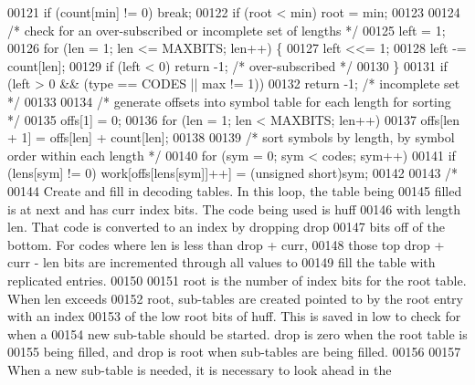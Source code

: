 \begin{DoxyCode}
00121         \textcolor{keywordflow}{if} (count[min] != 0) \textcolor{keywordflow}{break};
00122     \textcolor{keywordflow}{if} (root < min) root = min;
00123 
00124     \textcolor{comment}{/* check for an over-subscribed or incomplete set of lengths */}
00125     left = 1;
00126     \textcolor{keywordflow}{for} (len = 1; len <= MAXBITS; len++) \{
00127         left <<= 1;
00128         left -= count[len];
00129         \textcolor{keywordflow}{if} (left < 0) \textcolor{keywordflow}{return} -1;        \textcolor{comment}{/* over-subscribed */}
00130     \}
00131     \textcolor{keywordflow}{if} (left > 0 && (type == CODES || max != 1))
00132         \textcolor{keywordflow}{return} -1;                      \textcolor{comment}{/* incomplete set */}
00133 
00134     \textcolor{comment}{/* generate offsets into symbol table for each length for sorting */}
00135     offs[1] = 0;
00136     \textcolor{keywordflow}{for} (len = 1; len < MAXBITS; len++)
00137         offs[len + 1] = offs[len] + count[len];
00138 
00139     \textcolor{comment}{/* sort symbols by length, by symbol order within each length */}
00140     \textcolor{keywordflow}{for} (sym = 0; sym < codes; sym++)
00141         \textcolor{keywordflow}{if} (lens[sym] != 0) work[offs[lens[sym]]++] = (\textcolor{keywordtype}{unsigned} short)sym;
00142 
00143     \textcolor{comment}{/*}
00144 \textcolor{comment}{       Create and fill in decoding tables.  In this loop, the table being}
00145 \textcolor{comment}{       filled is at next and has curr index bits.  The code being used is huff}
00146 \textcolor{comment}{       with length len.  That code is converted to an index by dropping drop}
00147 \textcolor{comment}{       bits off of the bottom.  For codes where len is less than drop + curr,}
00148 \textcolor{comment}{       those top drop + curr - len bits are incremented through all values to}
00149 \textcolor{comment}{       fill the table with replicated entries.}
00150 \textcolor{comment}{}
00151 \textcolor{comment}{       root is the number of index bits for the root table.  When len exceeds}
00152 \textcolor{comment}{       root, sub-tables are created pointed to by the root entry with an index}
00153 \textcolor{comment}{       of the low root bits of huff.  This is saved in low to check for when a}
00154 \textcolor{comment}{       new sub-table should be started.  drop is zero when the root table is}
00155 \textcolor{comment}{       being filled, and drop is root when sub-tables are being filled.}
00156 \textcolor{comment}{}
00157 \textcolor{comment}{       When a new sub-table is needed, it is necessary to look ahead in the}

\end{DoxyCode}
